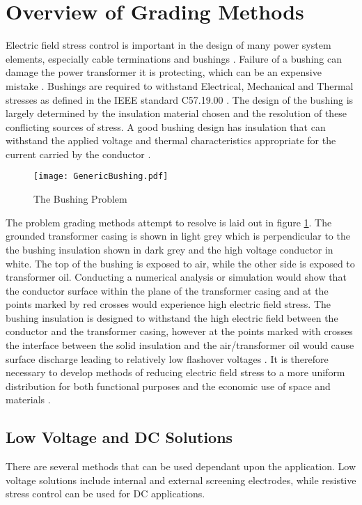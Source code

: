 \section{Overview of Grading Methods} 
Electric field stress control is important in the design of many power system elements, especially cable terminations and bushings \cite{james2008condition}.
Failure of a bushing can damage the power transformer it is protecting, which can be an expensive mistake \cite{warne2005newnes}.
Bushings are required to withstand Electrical, Mechanical and Thermal stresses as defined in the IEEE standard C57.19.00 \cite{1440990}.
The design of the bushing is largely determined by the insulation material chosen and the resolution of these conflicting sources of stress.
A good bushing design has insulation that can withstand the applied voltage and thermal characteristics appropriate for the current carried by the conductor \cite{harlow2004electric}.

\begin{figure}[!h]
   \centering
   \texttt{[image: GenericBushing.pdf]}
   \caption{The Bushing Problem}
   \label{figure:problem}
\end{figure}

The problem grading methods attempt to resolve is laid out in figure \ref{figure:problem}.
The grounded transformer casing is shown in light grey which is perpendicular to the the bushing insulation shown in dark grey and the high voltage conductor in white.
The top of the bushing is exposed to air, while the other side is exposed to transformer oil.
Conducting a numerical analysis or simulation would show that the conductor surface within the plane of the transformer casing and at the points marked by red crosses would experience high electric field stress.
The bushing insulation is designed to withstand the high electric field between the conductor and the transformer casing, however at the points marked with crosses the interface between the solid insulation and the air/transformer oil would cause surface discharge leading to relatively low flashover voltages \cite{kuffel2000high}.
It is therefore necessary to develop methods of reducing electric field stress to a more uniform distribution for both functional purposes and the economic use of space and materials \cite{james2008condition}.

\subsection{Low Voltage and DC Solutions}
There are several methods that can be used dependant upon the application.
Low voltage solutions include internal and external screening electrodes, while resistive stress control can be used for DC applications.

